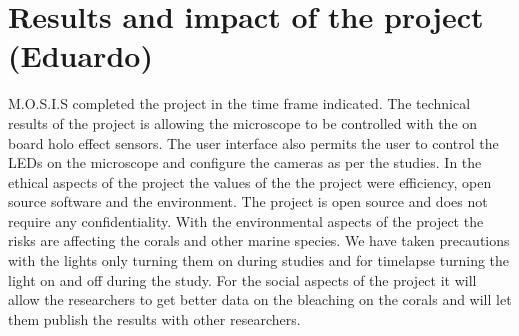 \section{Results and impact of the project (Eduardo)}
M.O.S.I.S completed the project in the time frame indicated. The technical results of the project is allowing the microscope to be controlled with the on board holo effect sensors. The user interface also permits the user to control the LEDs on the microscope and configure the cameras as per the studies. In the ethical aspects of the project the values of the the project were efficiency, open source software and the environment. The project is open source and does not require any confidentiality. With the environmental aspects of the project the risks are affecting the corals and other marine species. We have taken precautions with the lights only turning them on during studies and for timelapse turning the light on and off during the study. For the social aspects of the project it will allow the researchers to get better data on the bleaching on the corals and will let them publish the results with other researchers.